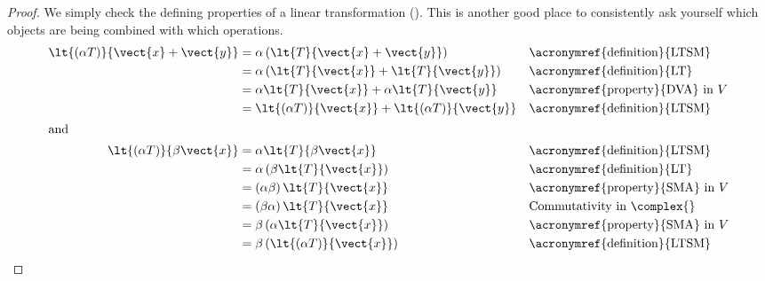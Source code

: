 %
\begin{proof}
We simply check the defining properties of a linear transformation ().  This is another good place to consistently ask yourself which objects are being combined with which operations.
%
\begin{align*}
\lt{(\alpha T)}{\vect{x}+\vect{y}}&=
\alpha\left(\lt{T}{\vect{x}+\vect{y}}\right)&&\text{\acronymref{definition}{LTSM}}\\
&=\alpha\left(\lt{T}{\vect{x}}+\lt{T}{\vect{y}}\right)&&\text{\acronymref{definition}{LT}}\\
&=\alpha\lt{T}{\vect{x}}+\alpha\lt{T}{\vect{y}}&&\text{\acronymref{property}{DVA} in $V$}\\
&=\lt{(\alpha T)}{\vect{x}}+\lt{(\alpha T)}{\vect{y}}&&\text{\acronymref{definition}{LTSM}}\\
%
\intertext{and}
%
\lt{(\alpha T)}{\beta\vect{x}}&=
\alpha\lt{T}{\beta\vect{x}}&&\text{\acronymref{definition}{LTSM}}\\
&=\alpha\left(\beta\lt{T}{\vect{x}}\right)&&\text{\acronymref{definition}{LT}}\\
&=\left(\alpha\beta\right)\lt{T}{\vect{x}}&&\text{\acronymref{property}{SMA} in $V$}\\
&=\left(\beta\alpha\right)\lt{T}{\vect{x}}&&\text{Commutativity in $\complex{}$}\\
&=\beta\left(\alpha\lt{T}{\vect{x}}\right)&&\text{\acronymref{property}{SMA} in $V$}\\
&=\beta\left(\lt{(\alpha T)}{\vect{x}}\right)&&\text{\acronymref{definition}{LTSM}}\\
%
\end{align*}
%
\end{proof}
%
